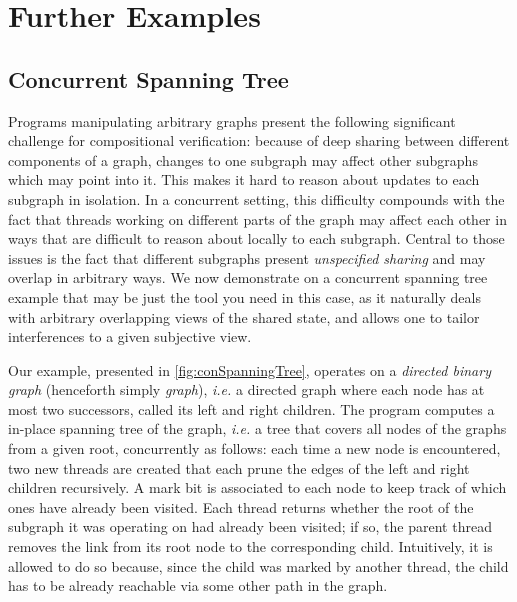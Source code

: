 \section{Further Examples}\label{sec:examples}

\subsection{Concurrent Spanning Tree}\label{subsec:CSTExample}

Programs manipulating arbitrary graphs present the following significant
challenge for compositional verification: because of deep sharing
between different components of a graph, changes to one subgraph may
affect other subgraphs which may point into it. This makes it hard to
reason about updates to each subgraph in isolation. In a concurrent
setting, this difficulty compounds with the fact that threads working
on different parts of the graph may affect each other in ways that are
difficult to reason about locally to each subgraph. Central to those
issues is the fact that different subgraphs present \emph{unspecified
  sharing} and may overlap in arbitrary ways. We now demonstrate on a
concurrent spanning tree example that \colosl may be just the tool you
need in this case, as it naturally deals with arbitrary overlapping
views of the shared state, and allows one to tailor interferences to a
given subjective view.

Our example, presented in \fig\ref{fig:conSpanningTree}, operates on a
\emph{directed binary graph} (henceforth simply \emph{graph}),
\textit{i.e.} a directed graph where each node has at most two
successors, called its left and right children. The program computes a
in-place spanning tree of the graph, \textit{i.e.} a tree that covers
all nodes of the graphs from a given root, concurrently as follows:
each time a new node is encountered, two new threads are created that
each prune the edges of the left and right children recursively. A
mark bit is associated to each node to keep track of which ones have
already been visited. Each thread returns whether the root
of the subgraph it was operating on had already been visited; if so,
the parent thread removes the link from its root node to the
corresponding child. Intuitively, it is allowed to do so because,
since the child was marked by another thread, the child has to be
already reachable via some other path in the graph.



